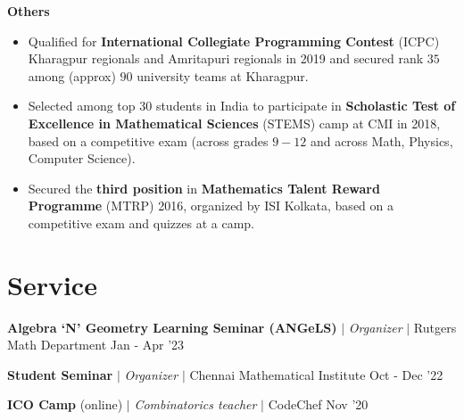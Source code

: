 \vspace{\gap}
\resumeProjectHeading
{\textbf{Others}}
{}
{
\item 
\begin{itemize}[itemsep=-4pt, parsep=5pt, leftmargin=0.5cm]
\item {}  Qualified for \textbf{International Collegiate Programming Contest} (ICPC) Kharagpur regionals and Amritapuri regionals in 2019 and secured rank $35$ among (approx) $90$ university teams at Kharagpur.
        \item Selected among top $30$ students in India to participate in \textbf{Scholastic Test of Excellence in Mathematical Sciences} (STEMS) camp at CMI in 2018, based on a competitive exam (across grades $9-12$ and across Math, Physics, Computer Science).
        \item Secured the \textbf{third position} in \textbf{Mathematics Talent Reward Programme} (MTRP) 2016, organized by ISI Kolkata, based on a competitive exam and quizzes at a camp.
\end{itemize}}
\resumeSubHeadingListEnd









\section{Service}
\resumeSubHeadingListStart



\resumeProjectHeading
{\textbf{Algebra `N' Geometry Learning Seminar (ANGeLS)} $|$ \textit{Organizer} $|$ Rutgers Math Department}
{Jan - Apr '23}
{}
\vspace{\mygap}

\resumeProjectHeading
{\textbf{Student Seminar} $|$ \textit{Organizer} $|$ Chennai Mathematical Institute}
{Oct - Dec '22}
{}
\vspace{\mygap}

\resumeProjectHeading
{\textbf{ICO Camp}  (online) $|$ \textit{Combinatorics teacher} $|$ CodeChef}
{Nov '20}
{}


